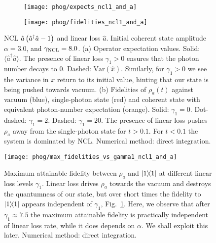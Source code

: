 \begin{figure}[htp]
\captionsetup{width=0.8\linewidth}
\centering
	\begin{subfigure}{0.7\linewidth}
	\centering
	\caption{}
	\texttt{[image: phog/expects\_ncl1\_and\_a]}
	\end{subfigure}
	\begin{subfigure}{0.7\linewidth}
	\centering
	\caption{}
	\texttt{[image: phog/fidelities\_ncl1\_and\_a]}
	\end{subfigure}
\caption{\label{fig:phog_A_ncl_loss} NCL $\hat{a}\left(\hat{a}^\dagger \hat{a} - 1\right)$ and linear loss $\hat{a}$. Initial coherent state amplitude $\alpha=3.0$, and $\gamma_{\text{NCL}}=8.0$. (a) Operator expectation values. Solid: $\langle \hat{a}^\dagger \hat{a}\rangle$. The presence of linear loss $\gamma_1 > 0$ ensures that the photon number decays to $0$. Dashed: $\text{Var}\left(\hat{x}\right)$. Similarly, for $\gamma_1 > 0$ we see the variance in $x$ return to its initial value, hinting that our state is being pushed towards vacuum. (b) Fidelities of $\rho_a\left(t\right)$ against vacuum (blue), single-photon state (red) and coherent state with equivalent photon-number expectation (orange). Solid: $\gamma_1 = 0$. Dot-dashed: $\gamma_1 = 2$. Dashed: $\gamma_1 = 20$. The presence of linear loss pushes $\rho_a$ away from the single-photon state for $t > 0.1$. For $t < 0.1$ the system is dominated by NCL. Numerical method: direct integration.}
\end{figure}


\begin{figure}[htp]
\captionsetup{width=0.8\linewidth}
\centering
\texttt{[image: phog/max\_fidelities\_vs\_gamma1\_ncl1\_and\_a]}
\caption{\label{fig:phog_max_fidelity} Maximum attainable fidelity between $\rho_a$ and $\dyad{1}$ at different linear loss levels $\gamma_1$. Linear loss drives $\rho_a$ towards the vacuum and destroys the quantumness of our state, but over short times the fidelity to $\dyad{1}$ appears independent of $\gamma_1$, Fig.~\ref{fig:phog_A_ncl_loss}. Here, we observe that after $\gamma_1 \approx 7.5$ the maximum attainable fidelity is practically independent of linear loss rate, while it does depends on $\alpha$. We shall exploit this later. Numerical method: direct integration.}
\end{figure}


